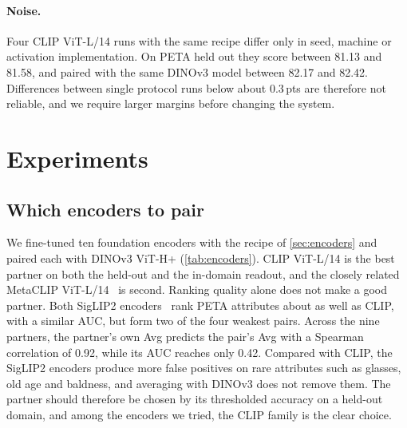 \documentclass[10pt,twocolumn,letterpaper]{article}
\newcommand{\pts}{\,pts}
\begin{document}
\paragraph{Noise.} Four CLIP ViT-L/14 runs with the same recipe differ only in seed, machine or activation implementation. On PETA held out they score between 81.13 and 81.58, and paired with the same DINOv3 model between 82.17 and 82.42. Differences between single protocol runs below about 0.3\pts{} are therefore not reliable, and we require larger margins before changing the system.

\section{Experiments}
\label{sec:experiments}

\subsection{Which encoders to pair}
\label{sec:pairing}

We fine-tuned ten foundation encoders with the recipe of \cref{sec:encoders} and paired each with DINOv3 ViT-H+ (\cref{tab:encoders}). CLIP ViT-L/14 is the best partner on both the held-out and the in-domain readout, and the closely related MetaCLIP ViT-L/14~\cite{metaclip} is second. Ranking quality alone does not make a good partner. Both SigLIP2 encoders~\cite{siglip2} rank PETA attributes about as well as CLIP, with a similar AUC, but form two of the four weakest pairs. Across the nine partners, the partner's own Avg predicts the pair's Avg with a Spearman correlation of 0.92, while its AUC reaches only 0.42. Compared with CLIP, the SigLIP2 encoders produce more false positives on rare attributes such as glasses, old age and baldness, and averaging with DINOv3 does not remove them. The partner should therefore be chosen by its thresholded accuracy on a held-out domain, and among the encoders we tried, the CLIP family is the clear choice.
\end{document}
